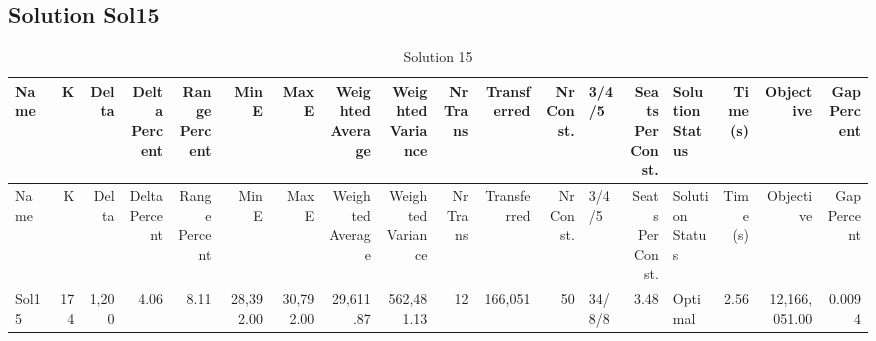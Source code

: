 \documentclass[a4paper]{article}
\begin{document}
\clearpage
\subsection{Solution Sol15}

{\scriptsize
\begin{longtable}{lrrrrrrrrrrrlrlrrr}
\caption{Solution 15}
\\ \toprule
Name &K &Delta &\shortstack{Delta\\Percent} &\shortstack{Range\\Percent} &Min E &Max E &\shortstack{Weighted\\Average} &\shortstack{Weighted\\Variance} &\shortstack{Nr\\Trans} &Transferred &\shortstack{Nr\\Const.} &3/4/5 &\shortstack{Seats\\Per\\Const.} &\shortstack{Solution\\Status} &\shortstack{Time\\(s)} &Objective &\shortstack{Gap\\Percent} \\ \midrule
\endfirsthead
\toprule
Name &K &Delta &\shortstack{Delta\\Percent} &\shortstack{Range\\Percent} &Min E &Max E &\shortstack{Weighted\\Average} &\shortstack{Weighted\\Variance} &\shortstack{Nr\\Trans} &Transferred &\shortstack{Nr\\Const.} &3/4/5 &\shortstack{Seats\\Per\\Const.} &\shortstack{Solution\\Status} &\shortstack{Time\\(s)} &Objective &\shortstack{Gap\\Percent} \\ \midrule
\endhead
\bottomrule
\endfoot
Sol15&174&1,200& 4.06& 8.11&28,392.00&30,792.00&29,611.87&562,481.13&12&166,051&50&34/8/8& 3.48&Optimal& 2.56&12,166,051.00&0.0094\\ 
\end{longtable}

}
\end{document}

